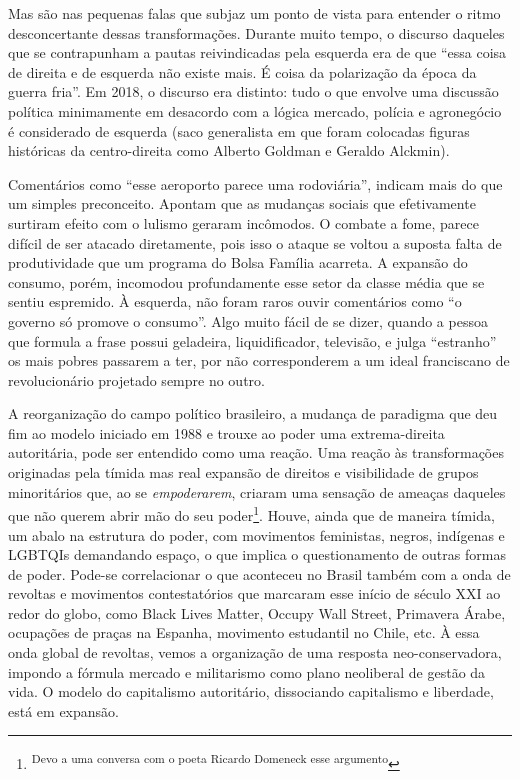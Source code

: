 Mas são nas pequenas falas que subjaz um ponto de vista para entender o
ritmo desconcertante dessas transformações. Durante muito tempo, o
discurso daqueles que se contrapunham a pautas reivindicadas pela
esquerda era de que ``essa coisa de direita e de esquerda não existe
mais. É coisa da polarização da época da guerra fria''. Em 2018, o
discurso era distinto: tudo o que envolve uma discussão política
minimamente em desacordo com a lógica mercado, polícia e agronegócio é
considerado de esquerda (saco generalista em que foram colocadas figuras
históricas da centro-direita como Alberto Goldman e Geraldo Alckmin).

Comentários como ``esse aeroporto parece uma rodoviária'', indicam mais
do que um simples preconceito. Apontam que as mudanças sociais que
efetivamente surtiram efeito com o lulismo geraram incômodos. O combate
a fome, parece difícil de ser atacado diretamente, pois isso o ataque se
voltou a suposta falta de produtividade que um programa do Bolsa Família
acarreta. A expansão do consumo, porém, incomodou profundamente esse
setor da classe média que se sentiu espremido. À esquerda, não foram
raros ouvir comentários como ``o governo só promove o consumo''. Algo
muito fácil de se dizer, quando a pessoa que formula a frase possui
geladeira, liquidificador, televisão, e julga ``estranho'' os mais
pobres passarem a ter, por não corresponderem a um ideal franciscano de
revolucionário projetado sempre no outro.

A reorganização do campo político brasileiro, a mudança de paradigma que
deu fim ao modelo iniciado em 1988 e trouxe ao poder uma extrema-direita
autoritária, pode ser entendido como uma reação. Uma reação às
transformações originadas pela tímida mas real expansão de direitos e
visibilidade de grupos minoritários que, ao se \emph{empoderarem},
criaram uma sensação de ameaças daqueles que não querem abrir mão do seu
poder\footnote{\textsuperscript{Devo a uma conversa com o poeta Ricardo
  Domeneck esse argumento}}. Houve, ainda que de maneira tímida, um
abalo na estrutura do poder, com movimentos feministas, negros,
indígenas e LGBTQIs demandando espaço, o que implica o questionamento de
outras formas de poder. Pode-se correlacionar o que aconteceu no Brasil
também com a onda de revoltas e movimentos contestatórios que marcaram
esse início de século XXI ao redor do globo, como Black Lives Matter,
Occupy Wall Street, Primavera Árabe, ocupações de praças na Espanha,
movimento estudantil no Chile, etc. À essa onda global de revoltas,
vemos a organização de uma resposta neo-conservadora, impondo a fórmula
mercado e militarismo como plano neoliberal de gestão da vida. O modelo
do capitalismo autoritário, dissociando capitalismo e liberdade, está em
expansão.

